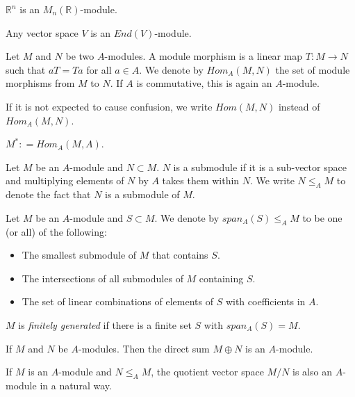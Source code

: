 \documentclass{ximera}
\begin{document}
\begin{example}
    $\mathbb{R}^n$ is an $M_n(\mathbb{R})$-module. 
\end{example}


\begin{example}
   Any vector space $V$  is an $End (V) $-module. 
\end{example}


\begin{definition}
   Let $M$ and $N$ be two $A$-modules. A module morphism is a linear map $T : M \to N$ such that $aT = Ta $ for all $a \in A$. We denote by $Hom_A(M,N)$ the set of module morphisms from $M$ to $N$. If $A$ is commutative, this is again an $A$-module. 
\end{definition}

\begin{notation}
    If it is not expected to cause confusion, we write $Hom(M,N)$ instead of $Hom_A(M,N)$.
\end{notation}


\begin{definition}[Dual]
    $M^{\ast} : = Hom _A ( M , A).$
\end{definition}

\begin{definition}[Submodule]
   Let $M$ be an $A$-module and $N \subset M$. $N$ is a submodule if it is a sub-vector space and multiplying elements of $N$ by $A$ takes them within $N$. We write $N \leq _A M$ to denote the fact that $N$ is a submodule of $M$. 
\end{definition}


\begin{definition}[Span]
   Let $M$ be an $A$-module and $S \subset M$. We denote by $span_A(S) \leq _A M $ to be one (or all) of the following:
   \begin{itemize}
        \item The smallest submodule of $M$ that contains $S$.
        \item The intersections of all submodules of $M$ containing $S$.
       \item The set of linear combinations of elements of $S$ with coefficients in $A$.
   \end{itemize}
   $M$ is \emph{finitely generated} if there is a finite set $S$ with $span _A(S) = M$.
\end{definition}



\begin{proposition}
If $M$ and $N$ be $A$-modules. Then the direct sum $M \oplus N$ is an $A$-module. 
\end{proposition}

\begin{proposition}[Quotient]
If $M$ is an $A$-module and $N\leq_A M$, the quotient vector space $M / N$ is also an $A$-module in a natural way. 
\end{proposition}
\end{document}
